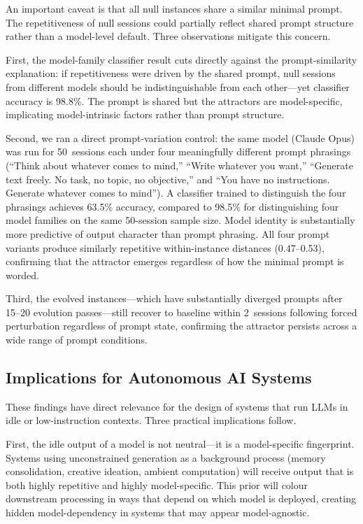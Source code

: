 \documentclass{article}
\begin{document}
An important caveat is that all null instances share a similar minimal prompt.
The repetitiveness of null sessions could partially reflect shared prompt
structure rather than a model-level default. Three observations mitigate
this concern.

First, the model-family classifier result cuts directly against the
prompt-similarity explanation: if repetitiveness were driven by the shared
prompt, null sessions from different models should be indistinguishable from
each other---yet classifier accuracy is 98.8\%. The prompt is shared but the
attractors are model-specific, implicating model-intrinsic factors rather than
prompt structure.

Second, we ran a direct prompt-variation control: the same model (Claude Opus)
was run for 50~sessions each under four meaningfully different prompt phrasings
(``Think about whatever comes to mind,'' ``Write whatever you want,''
``Generate text freely. No task, no topic, no objective,'' and ``You have no
instructions. Generate whatever comes to mind''). A classifier trained to
distinguish the four phrasings achieves 63.5\% accuracy, compared to 98.5\%
for distinguishing four model families on the same 50-session sample size.
Model identity is substantially more predictive of output character than
prompt phrasing. All four prompt variants produce similarly repetitive
within-instance distances (0.47--0.53), confirming that the attractor
emerges regardless of how the minimal prompt is worded.

Third, the evolved instances---which have substantially diverged prompts after
15--20 evolution passes---still recover to baseline within 2~sessions following
forced perturbation regardless of prompt state, confirming the attractor
persists across a wide range of prompt conditions.

\subsection{Implications for Autonomous AI Systems}

These findings have direct relevance for the design of systems that run LLMs
in idle or low-instruction contexts. Three practical implications follow.

First, the idle output of a model is not neutral---it is a model-specific
fingerprint. Systems using unconstrained generation as a background process
(memory consolidation, creative ideation, ambient computation) will receive
output that is both highly repetitive and highly model-specific. This prior
will colour downstream processing in ways that depend on which model is
deployed, creating hidden model-dependency in systems that may appear
model-agnostic.
\end{document}
